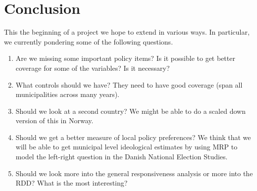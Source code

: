 \documentclass[a4paper,12pt]{article}
\newcommand{\beginsupplement}{%
	\setcounter{table}{0}
	\renewcommand{\thetable}{S.\arabic{table}}%
	\setcounter{figure}{0}
	\renewcommand{\thefigure}{S.\arabic{figure}}%
}
\begin{document}
	
\section{Conclusion}
This the beginning of a project we hope to extend in various ways. In particular, we currently pondering some of the following questions.
\begin{enumerate}
	\item Are we missing some important policy items? Is it possible to get better coverage for some of the variables? Is it necessary?
	\item  What controls should we have? They need to have good coverage (span all municipalities across many years).
	\item Should we look at a second country? We might be able to do a scaled down version of this in Norway. 
	\item Should we get a better measure of local policy preferences? We think that we will be able to get municipal level ideological estimates by using MRP to model the left-right question in the Danish National Election Studies.
	\item Should we look more into the general responsiveness analysis or more into the RDD? What is the most interesting?
\end{enumerate}








	
\end{document}
